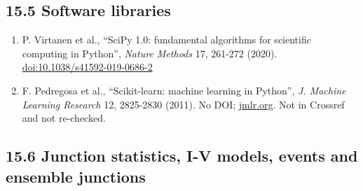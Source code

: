 \documentclass[
  11pt,
  a4paper,
]{article}
\providecommand{\tightlist}{%
  \setlength{\itemsep}{0pt}\setlength{\parskip}{0pt}}
\begin{document}
\hypertarget{software-libraries}{%
\subsection{15.5 Software libraries}\label{software-libraries}}

\begin{enumerate}
\def\labelenumi{\arabic{enumi}.}
\setcounter{enumi}{23}
\tightlist
\item
  P. Virtanen et al., ``SciPy 1.0: fundamental algorithms for scientific
  computing in Python'', \emph{Nature Methods} 17, 261-272 (2020).
  \href{https://doi.org/10.1038/s41592-019-0686-2}{doi:10.1038/s41592-019-0686-2}
\item
  F. Pedregosa et al., ``Scikit-learn: machine learning in Python'',
  \emph{J. Machine Learning Research} 12, 2825-2830 (2011). No DOI;
  \href{https://jmlr.org/papers/v12/pedregosa11a.html}{jmlr.org}. Not in
  Crossref and not re-checked.
\end{enumerate}

\hypertarget{junction-statistics-i-v-models-events-and-ensemble-junctions}{%
\subsection{15.6 Junction statistics, I-V models, events and ensemble
junctions}\label{junction-statistics-i-v-models-events-and-ensemble-junctions}}
\end{document}

